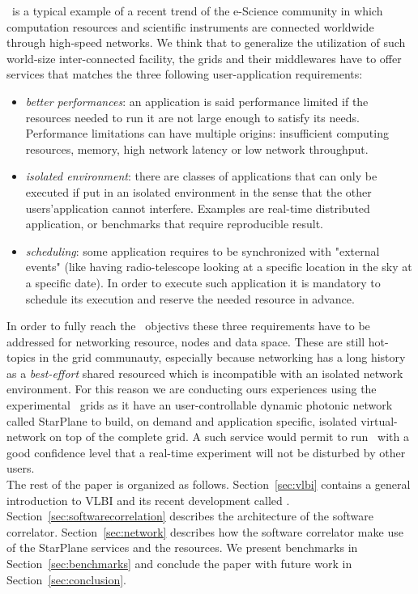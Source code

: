 \scarie\ is a typical example of a recent trend of the e-Science 
community in which computation resources and scientific instruments 
are connected worldwide through high-speed networks. We think that to 
generalize the utilization of such world-size inter-connected facility, 
the grids and their middlewares have to offer services that matches the three
following user-application requirements:
\begin{itemize}
\item \emph{better performances}: an application is said performance
  limited if the resources needed to run it are not large enough to
  satisfy its needs. Performance limitations can have multiple
  origins: insufficient computing resources, memory, high network
  latency or low network throughput.
  
\item \emph{isolated environment}: there are classes of applications
  that can only be executed if put in an isolated environment in the 
  sense that the other users'application cannot interfere. Examples are 
  real-time distributed application, or benchmarks that require reproducible
  result. 

\item \emph{scheduling}: some application requires to be synchronized
  with "external events" (like having radio-telescope looking at a
  specific location in the sky at a specific date). In order to
  execute such application it is mandatory to schedule its execution 
  and reserve the needed resource in advance.
\end{itemize}
In order to fully reach the \scarie\ objectivs these three 
requirements have to be addressed for networking resource, nodes and 
data space. These are still hot-topics in the grid communauty, 
especially because networking has a long history as a 
\emph{best-effort} shared resourced which is incompatible 
with an isolated network environment. For this reason we are 
conducting ours experiences using the experimental \ 
grids as it have an user-controllable dynamic photonic 
network called StarPlane to build, on demand and application specific, 
isolated virtual-network on top of the complete grid. A such service would 
permit to run \scarie\ with a good confidence level that a real-time 
experiment will not be disturbed by other users. \\

The rest of the paper is organized as follows. Section~\ref{sec:vlbi}
contains a general introduction to VLBI and its recent development 
called \evlbi. Section~\ref{sec:softwarecorrelation} describes the 
architecture of the software correlator. Section~\ref{sec:network} 
describes how the software correlator make use of the StarPlane services 
and the \das3 resources. We present benchmarks in Section~\ref{sec:benchmarks} 
and conclude the paper with future work in Section~\ref{sec:conclusion}.



